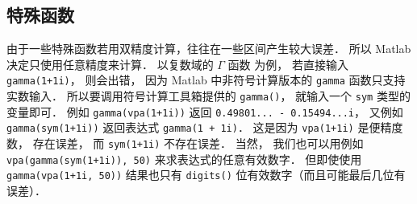\subsection{特殊函数}
由于一些特殊函数若用双精度计算，往往在一些区间产生较大误差． 所以 Matlab 决定只使用任意精度来计算． 以复数域的 $\Gamma$ 函数 为例， 若直接输入 \verb|gamma(1+1i)|， 则会出错， 因为 Matlab 中非符号计算版本的 \verb|gamma| 函数只支持实数输入． 所以要调用符号计算工具箱提供的 \verb|gamma()|， 就输入一个 \verb|sym| 类型的变量即可． 例如 \verb|gamma(vpa(1+1i))| 返回 \verb|0.49801... - 0.15494...i|， 又例如 \verb|gamma(sym(1+1i))| 返回表达式 \verb|gamma(1 + 1i)|． 这是因为 \verb|vpa(1+1i)| 是便精度数， 存在误差， 而 \verb|sym(1+1i)| 不存在误差． 当然， 我们也可以用例如 \verb|vpa(gamma(sym(1+1i)), 50)| 来求表达式的任意有效数字． 但即使使用 \verb|gamma(vpa(1+1i, 50))| 结果也只有 \verb|digits()| 位有效数字（而且可能最后几位有误差）．
